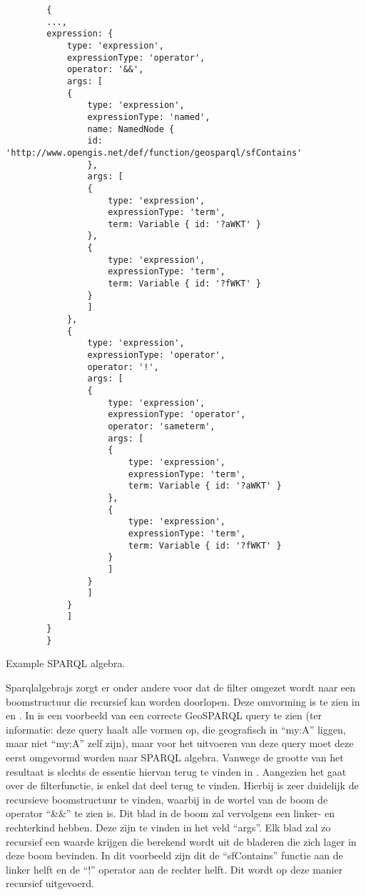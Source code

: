 \begin{listing}[ht]
    \begin{verbatim}
        {
        ...,
        expression: {
            type: 'expression',
            expressionType: 'operator',
            operator: '&&',
            args: [
            {
                type: 'expression',
                expressionType: 'named',
                name: NamedNode {
                id: 'http://www.opengis.net/def/function/geosparql/sfContains'
                },
                args: [
                {
                    type: 'expression',
                    expressionType: 'term',
                    term: Variable { id: '?aWKT' }
                },
                {
                    type: 'expression',
                    expressionType: 'term',
                    term: Variable { id: '?fWKT' }
                }
                ]
            },
            {
                type: 'expression',
                expressionType: 'operator',
                operator: '!',
                args: [
                {
                    type: 'expression',
                    expressionType: 'operator',
                    operator: 'sameterm',
                    args: [
                    {
                        type: 'expression',
                        expressionType: 'term',
                        term: Variable { id: '?aWKT' }
                    },
                    {
                        type: 'expression',
                        expressionType: 'term',
                        term: Variable { id: '?fWKT' }
                    }
                    ]
                }
                ]
            }
            ]
        }
        }
    \end{verbatim}
    \caption{Example SPARQL algebra.}
    \label{listing:sparqlalgebrajs_algebra}
\end{listing}

Sparqlalgebrajs zorgt er onder andere voor dat de filter omgezet wordt naar een boomstructuur die recursief kan worden doorlopen. Deze omvorming is te zien in  en . In  is een voorbeeld van een correcte GeoSPARQL query te zien (ter informatie: deze query haalt alle vormen op, die geografisch in ``my:A'' liggen, maar niet ``my:A'' zelf zijn), maar voor het uitvoeren van deze query moet deze eerst omgevormd worden naar SPARQL algebra. Vanwege de grootte van het resultaat is slechts de essentie hiervan terug te vinden in . Aangezien het gaat over de filterfunctie, is enkel dat deel terug te vinden. Hierbij is zeer duidelijk de recursieve boomstructuur te vinden, waarbij in de wortel van de boom de operator ``\&\&'' te zien is. Dit blad in de boom zal vervolgens een linker- en rechterkind hebben. Deze zijn te vinden in het veld ``args''. Elk blad zal zo recursief een waarde krijgen die berekend wordt uit de bladeren die zich lager in deze boom bevinden. In dit voorbeeld zijn dit de ``sfContains'' functie aan de linker helft en de ``!'' operator aan de rechter helft. Dit wordt op deze manier recursief uitgevoerd.

